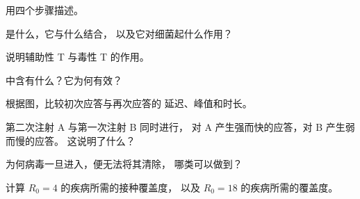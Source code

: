 \begin{exercise}[$\star$]\label{exo:g12:adaptive-immunity:2}
用四个步骤描述。
\end{exercise}

\begin{exercise}[$\star$]\label{exo:g12:adaptive-immunity:3}
是什么，它与什么结合，
以及它对细菌起什么作用？
\end{exercise}

\begin{exercise}[$\star$]\label{exo:g12:adaptive-immunity:4}
说明辅助性 T 与毒性 T 的作用。
\end{exercise}

\begin{exercise}[$\star$]\label{exo:g12:adaptive-immunity:5}
中含有什么？它为何有效？
\end{exercise}

\begin{exercise}[$\star\star$]\label{exo:g12:adaptive-immunity:6}
根据图，比较初次应答与再次应答的
延迟、峰值和时长。
\end{exercise}

\begin{exercise}[$\star\star$]\label{exo:g12:adaptive-immunity:7}
第二次注射 A 与第一次注射 B 同时进行，
对 A 产生强而快的应答，对 B 产生弱而慢的应答。
这说明了什么？
\end{exercise}

\begin{exercise}[$\star\star$]\label{exo:g12:adaptive-immunity:8}
为何病毒一旦进入，便无法将其清除，
哪类可以做到？
\end{exercise}

\begin{exercise}[$\star\star$]\label{exo:g12:adaptive-immunity:9}
计算 $R_0 = 4$ 的疾病所需的接种覆盖度，
以及 $R_0 = 18$ 的疾病所需的覆盖度。
\end{exercise}

